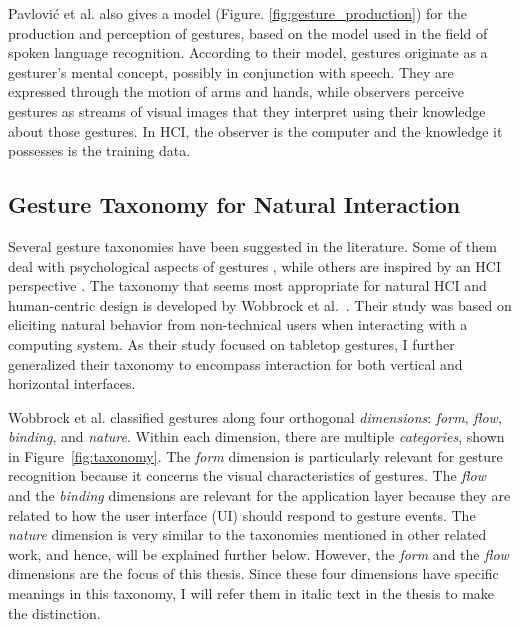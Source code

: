 Pavlovi\'{c} et al. \cite{Pavlovic97} also gives a model (Figure. 
\ref{fig:gesture_production}) for the production and perception of gestures, 
based on the model used in the field of spoken language recognition. According 
to their model, gestures originate as a gesturer's mental concept, possibly in 
conjunction with speech. They are expressed through the motion of arms and 
hands, while observers perceive gestures as streams of visual images that they
interpret using their knowledge about those gestures. In HCI, the 
observer is the computer and the knowledge it possesses is the training data.

\subsection{Gesture Taxonomy for Natural Interaction}\label{sec:taxonomy}
Several gesture taxonomies have been suggested in the literature. Some of them
deal with psychological aspects of gestures \cite{kendon86, mcneill82}, while
others are inspired by an HCI perspective \cite{Pavlovic97, quek95, wobbrock09}. 
The taxonomy that seems most appropriate for natural HCI and human-centric
design is developed by Wobbrock et al.~\cite{wobbrock09}. Their study was based
on eliciting natural behavior from non-technical users when interacting with a computing system.
As their study focused on tabletop gestures, I further generalized their
taxonomy to encompass interaction for both vertical and horizontal interfaces.

Wobbrock et al. \cite{wobbrock09} classified gestures along four
orthogonal \textit{dimensions}: \textit{form},
\textit{flow}, \textit{binding}, and \textit{nature}. Within each
dimension, there are multiple \textit{categories}, shown in
Figure~\ref{fig:taxonomy}.
The \textit{form} dimension is particularly relevant for gesture recognition
because it concerns the visual characteristics of gestures.
The \textit{flow} and the \textit{binding} dimensions are relevant for the
application layer because they are related to how the user interface (UI) should
respond to gesture events. The \textit{nature} dimension is very similar to the
taxonomies mentioned in other related work, and hence, will be explained further
below. However, the \textit{form} and the \textit{flow} dimensions are the focus
of this thesis.
Since these four dimensions have specific meanings in this taxonomy, I will refer them in italic text in the thesis to make the distinction.

